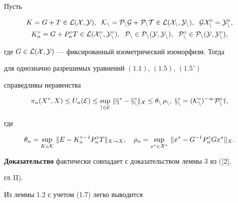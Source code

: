 \begin{lems}


Пусть


\begin{gather*}


K=G+T\in \cal L(X,Y),\ \; K_n=P_nG+P_nT\in \cal L(X_n,Y_n),\ \;


GX_n^\circ =Y_n^\circ , \\


%


K_n^\circ =G+P_n^\circ T\in \cal L(X_n^\circ ,Y_n^\circ),\ \;


P_n\in \cal P_n(Y,Y_n),\ \; P_n^\circ\in \cal P_n(Y,Y_n^\circ),


\end{gather*}


где $G\in \cal L(X,Y)$ --- фиксированный изометрический изоморфизм. Тогда


для однозначно разрешимых уравнений $(1.1)$, $(1.5)$, $(1.5^\circ )$


справедливы неравенства


$$


\pi_n(X^*,X)\leq U_n(\cal E)\leq


\sup_{e\in\cal E}\, \|x^*-x_n^\circ\|_X\leq \theta_n\, \rho_n,


\; x_n^\circ =(K_n^\circ )^{-1} P_n^\circ y,


$$


где


$$


\theta_n= \sup_{K\in \cal K}\, \|E-K_n^\circ {}^{-1}P_n^\circ


T\|_{X\rightarrow X},\quad


\rho_n= \sup_{x^*\in X^*}\, \|x^*-G^{-1}P_n^\circ Gx^*\|_X .


$$


\end{lems}





{\bf Доказательство} фактически совпадает с доказательством леммы 3 из ([2],


гл.\,II).





Из леммы 1.2 с учетом (1.7) легко выводится





